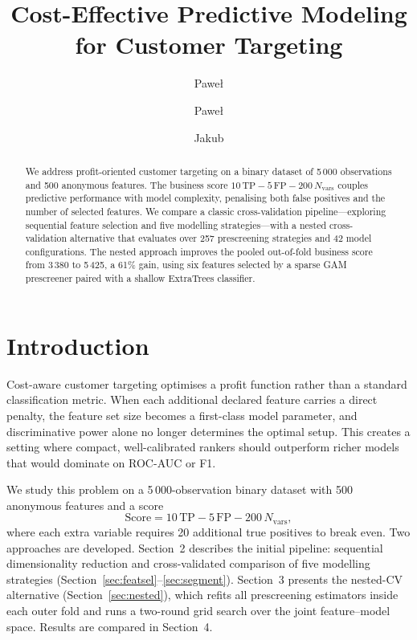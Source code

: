 \documentclass[cameraready]{Interspeech}
\title{Cost-Effective Predictive Modeling for Customer Targeting}
\author[affiliation={1}]{Paweł}{Pozorski}
\author[affiliation={1}]{Paweł}{Florek}
\author[affiliation={1}]{Jakub}{Półtorak}
\begin{document}
\maketitle
\pagestyle{plain}
\thispagestyle{plain}

\begin{abstract}
We address profit-oriented customer targeting on a binary dataset of 5\,000 observations and 500 anonymous features.
The business score $10\,\mathrm{TP} - 5\,\mathrm{FP} - 200\,N_{\mathrm{vars}}$ couples predictive performance with model complexity,
penalising both false positives and the number of selected features.
We compare a classic cross-validation pipeline---exploring sequential feature selection and five modelling strategies---with a nested cross-validation alternative that evaluates over 257 prescreening strategies and 42 model configurations.
The nested approach improves the pooled out-of-fold business score from 3\,380 to 5\,425, a 61\% gain, using six features selected by a sparse GAM prescreener paired with a shallow ExtraTrees classifier.
\end{abstract}

\section{Introduction}
\label{sec:intro}

Cost-aware customer targeting optimises a profit function rather than a standard classification metric.
When each additional declared feature carries a direct penalty, the feature set size becomes a first-class model parameter, and discriminative power alone no longer determines the optimal setup.
This creates a setting where compact, well-calibrated rankers should outperform richer models that would dominate on ROC-AUC or F1.

We study this problem on a 5\,000-observation binary dataset with 500 anonymous features and a score
\[
\text{Score} = 10\,\mathrm{TP} - 5\,\mathrm{FP} - 200\,N_{\mathrm{vars}},
\]
where each extra variable requires 20 additional true positives to break even.
Two approaches are developed. Section~2 describes the initial pipeline: sequential dimensionality reduction and cross-validated comparison of five modelling strategies (Section~\ref{sec:featsel}--\ref{sec:segment}).
Section~3 presents the nested-CV alternative (Section~\ref{sec:nested}), which refits all prescreening estimators inside each outer fold and runs a two-round grid search over the joint feature--model space.
Results are compared in Section~4.
\end{document}
